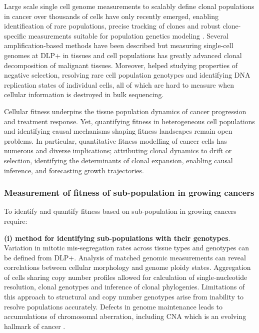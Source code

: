 Large scale single cell genome measurements to scalably define clonal populations in cancer over thousands of cells have only  recently emerged, enabling identification of rare populations, precise tracking of clones and robust clone-specific measurements suitable for population genetics modeling  \cite{laks2019clonal,zahn2017scalable}. Several amplification-based methods have been described \cite{navin2011tumour,zong2012genome, hou2012single,ni2013reproducible} but measuring single-cell genomes at \ac{DLP+} in tissues and cell populations has greatly advanced clonal decomposition of malignant tissues. Moreover, helped studying properties of negative selection, resolving rare cell population genotypes and identifying DNA replication states of individual cells, all of which are hard to measure when cellular information is destroyed in bulk sequencing. 

Cellular fitness underpins the tissue population dynamics of cancer progression and treatment response. Yet, quantifying fitness in heterogeneous cell populations and identifying causal mechanisms shaping fitness landscapes remain open problems. In particular, quantitative fitness modelling of cancer cells has numerous and diverse implications; attributing clonal dynamics to drift or selection, identifying the determinants of clonal expansion, enabling causal inference, and forecasting growth trajectories. 

\subsubsection{Measurement of fitness of sub-population in growing cancers}

To identify and quantify fitness based on sub-population in growing cancers require: 

\textbf{(i) method for identifying sub-populations with their genotypes}.
Variation in mitotic mis-segregation rates across tissue types and genotypes can be defined from DLP+. Analysis of matched genomic  measurements can reveal correlations between cellular morphology and genome ploidy states. Aggregation of cells sharing copy number profiles allowed for calculation of single-nucleotide resolution, clonal genotypes and inference of clonal phylogenies.
Limitations of this approach to structural and copy number genotypes arise from inability to resolve populations accurately. Defects in genome maintenance leads to accumulations of chromosomal aberration, including \ac{CNA} which is an evolving hallmark of cancer \cite{negrini2010genomic}. 


